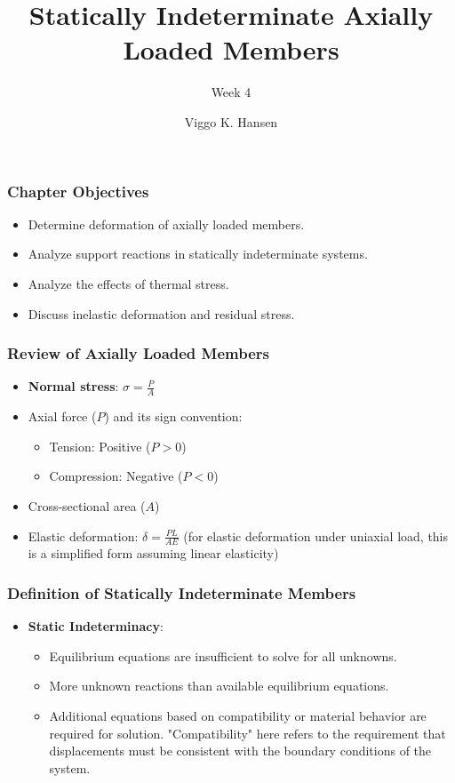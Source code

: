 \documentclass{beamer}
\title{Statically Indeterminate Axially Loaded Members}
\subtitle{Week 4}
\author{Viggo K. Hansen}
\institute{ISE}
\begin{document}
\begin{frame}
    \titlepage
\end{frame}

\begin{frame}
    \frametitle{Chapter Objectives}
    \begin{itemize}
        \item Determine deformation of axially loaded members.
        \item Analyze support reactions in statically indeterminate systems.
        \item Analyze the effects of thermal stress.
        \item Discuss inelastic deformation and residual stress.
    \end{itemize}
\end{frame}

\begin{frame}
    \frametitle{Review of Axially Loaded Members}
    \begin{itemize}
        \item \textbf{Normal stress}: $\sigma = \frac{P}{A}$
        \item Axial force ($P$) and its sign convention:
            \begin{itemize}
                \item Tension: Positive ($P > 0$)
                \item Compression: Negative ($P < 0$)
            \end{itemize}
        \item Cross-sectional area ($A$)
        \item Elastic deformation: $\delta = \frac{PL}{AE}$ (for elastic deformation under uniaxial load, this is a simplified form assuming linear elasticity)
    \end{itemize}
\end{frame}

\begin{frame}
    \frametitle{Definition of Statically Indeterminate Members}
    \begin{itemize}
        \item \textbf{Static Indeterminacy}: 
        \begin{itemize}
            \item Equilibrium equations are insufficient to solve for all unknowns.
            \item More unknown reactions than available equilibrium equations.
            \item Additional equations based on compatibility or material behavior are required for solution. "Compatibility" here refers to the requirement that displacements must be consistent with the boundary conditions of the system.
        \end{itemize}
    \end{itemize}
\end{frame}
\end{document}
